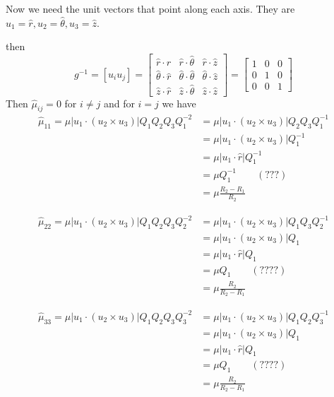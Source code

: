 \documentclass{amsart}
\begin{document}
Now we need the unit vectors that point along each axis. They are $u_1=\hat{r},u_2=\hat{\theta},u_3=\hat{z}$.

then
\[
  g^{-1}=
  [u_iu_j]=
  \begin{bmatrix}
    \hat{r}\cdot\hat{r} & \hat{r}\cdot\hat{\theta} & \hat{r}\cdot\hat{z}\\
    \hat{\theta}\cdot\hat{r} & \hat{\theta}\cdot\hat{\theta} & \hat{\theta}\cdot\hat{z}\\
    \hat{z}\cdot\hat{r} & \hat{z}\cdot\hat{\theta} & \hat{z}\cdot\hat{z}
  \end{bmatrix}
  =
  \begin{bmatrix}
    1 & 0 & 0\\
    0 & 1 & 0\\
    0 & 0 & 1
  \end{bmatrix}
\]
Then $\hat{\mu}_{ij}=0$ for $i\neq j$ and for $i=j$ we have
\begin{align*}
  \hat{\mu}_{11}=\mu|u_1\cdot(u_2\times u_3)|Q_1Q_2Q_3Q_1^{-2}
  &=\mu|u_1\cdot(u_2\times u_3)|Q_2Q_3Q_1^{-1}\\
  &=\mu|u_1\cdot(u_2\times u_3)|Q_1^{-1}\\
  &=\mu|u_1\cdot\hat{r}|Q_1^{-1}\\
  &=\mu Q_1^{-1}\qquad (???)\\
  &=\mu \frac{R_2-R_1}{R_2}
\end{align*}

\begin{align*}
  \hat{\mu}_{22}=\mu|u_1\cdot(u_2\times u_3)|Q_1Q_2Q_3Q_2^{-2}
  &=\mu|u_1\cdot(u_2\times u_3)|Q_1Q_3Q_2^{-1}\\
  &=\mu|u_1\cdot(u_2\times u_3)|Q_1\\
  &=\mu|u_1\cdot\hat{r}|Q_1\\
  &=\mu Q_1\qquad (????)\\
  &=\mu \frac{R_2}{R_2-R_1}
\end{align*}

\begin{align*}
  \hat{\mu}_{33}=\mu|u_1\cdot(u_2\times u_3)|Q_1Q_2Q_3Q_3^{-2}
  &=\mu|u_1\cdot(u_2\times u_3)|Q_1Q_2Q_3^{-1}\\
  &=\mu|u_1\cdot(u_2\times u_3)|Q_1\\
  &=\mu|u_1\cdot\hat{r}|Q_1\\
  &=\mu Q_1\qquad (????)\\
  &=\mu \frac{R_2}{R_2-R_1}
\end{align*}

\end{document}

